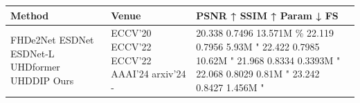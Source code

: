 \begin{tabular}{lll}
\toprule
Method & Venue & PSNR ↑ SSIM ↑ Param ↓ FS \\
\midrule
FHDe2Net ESDNet ESDNet-L UHDformer UHDDIP Ours & ECCV’20 ECCV’22 ECCV’22 AAAI’24 arxiv’24 - & 20.338 0.7496 13.571M \% 22.119 0.7956 5.93M " 22.422 0.7985 10.62M " 21.968 0.8334 0.3393M " 22.068 0.8029 0.81M " 23.242 0.8427 1.456M " \\
\bottomrule
\end{tabular}
